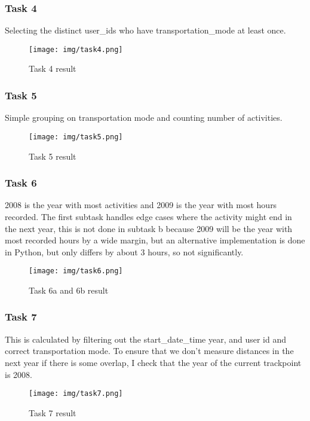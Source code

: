 \documentclass[12pt, titlepage]{report}
\begin{document}
\subsubsection*{Task 4}
Selecting the distinct user\_ids who have transportation\_mode at least once.
\begin{figure}[H]
    \centering
    \texttt{[image: img/task4.png]}
    \caption{Task 4 result}
    \label{fig:my_label}
\end{figure}

\subsubsection*{Task 5}
Simple grouping on transportation mode and counting number of activities.
\begin{figure}[H]
    \centering
    \texttt{[image: img/task5.png]}
    \caption{Task 5 result}
    \label{fig:my_label}
\end{figure}

\subsubsection*{Task 6}
2008 is the year with most activities and 2009 is the year with most hours recorded. The first subtask handles edge cases where the activity might end in the next year, this is not done in subtask b because 2009 will be the year with most recorded hours by a wide margin, but an alternative implementation is done in Python, but only differs by about 3 hours, so not significantly.
\begin{figure}[H]
    \centering
    \texttt{[image: img/task6.png]}
    \caption{Task 6a and 6b result}
    \label{fig:my_label}
\end{figure}

\subsubsection*{Task 7}
This is calculated by filtering out the start\_date\_time year, and user id and correct transportation mode. To ensure that we don't measure distances in the next year if there is some overlap, I check that the year of the current trackpoint is 2008.
\begin{figure}[H]
    \centering
    \texttt{[image: img/task7.png]}
    \caption{Task 7 result}
    \label{fig:my_label}
\end{figure}
\end{document}
